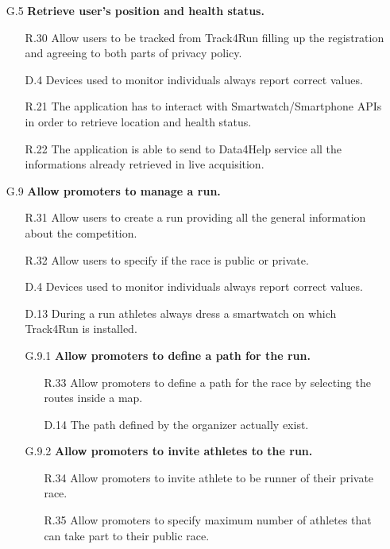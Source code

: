 \begin{enumerate}
	\begin{enumerate}
	\item [G.5] \textbf{Retrieve user's position and health status.}
		\begin{enumerate}
		\item [R.30] Allow users to be tracked from Track4Run filling up the registration and agreeing to both parts of privacy policy.
		\item [D.4] Devices used to monitor individuals always report correct values.
		\item [R.21] The application has to interact with Smartwatch/Smartphone APIs in order to retrieve location and health status.
		\item [R.22] The application is able to send to Data4Help service all the informations already retrieved in live acquisition.
		\end{enumerate}
		
	\item [G.9] \textbf{Allow promoters to manage a run.}
		\begin{enumerate}
		\item [R.31] Allow users to create a run providing all the general information about the competition.
		\item [R.32] Allow users to specify if the race is public or private.
		\item [D.4] Devices used to monitor individuals always report correct values.
		\item [D.13] During a run athletes always dress a smartwatch on which Track4Run is installed.
			
		\item [G.9.1] \textbf{Allow promoters to define a path for the run.}
			\begin{enumerate}
			\item [R.33] Allow promoters to define a path for the race by selecting the routes inside a map.
			\item [D.14] The path defined by the organizer actually exist.
			\end{enumerate}
			
		\item [G.9.2] \textbf{Allow promoters to invite athletes to the run.}
			\begin{enumerate}
			\item [R.34] Allow promoters to invite athlete to be runner of their private race.
			\item [R.35] Allow promoters to specify maximum number of athletes that can take part to their public race.
			\end{enumerate}
	\end{enumerate}
	

\end{enumerate}
\end{enumerate}
